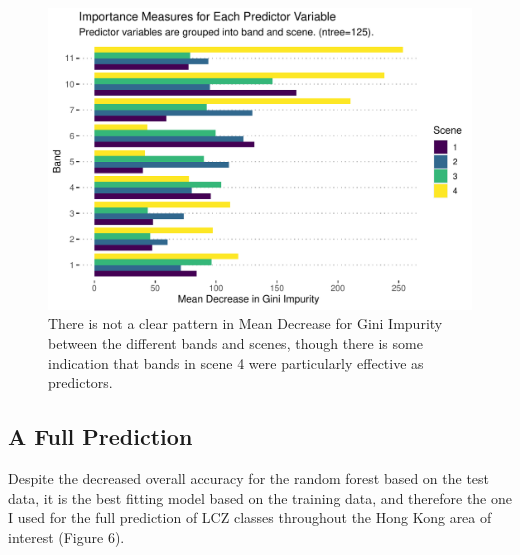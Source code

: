 \documentclass[
]{article}
\begin{document}
\begin{figure}[H]

{\centering \includegraphics[width=0.75\linewidth]{../results/plots/importance_barplot_ntree125} 

}

\caption{There is not a clear pattern in Mean Decrease for Gini Impurity between the different bands and scenes, though there is some indication that bands in scene 4 were particularly effective as predictors.}\label{fig:image-ref-for-in-text5}
\end{figure}

\hypertarget{a-full-prediction}{%
\subsection{A Full Prediction}\label{a-full-prediction}}

Despite the decreased overall accuracy for the random forest based on
the test data, it is the best fitting model based on the training data,
and therefore the one I used for the full prediction of LCZ classes
throughout the Hong Kong area of interest (Figure 6).
\end{document}
